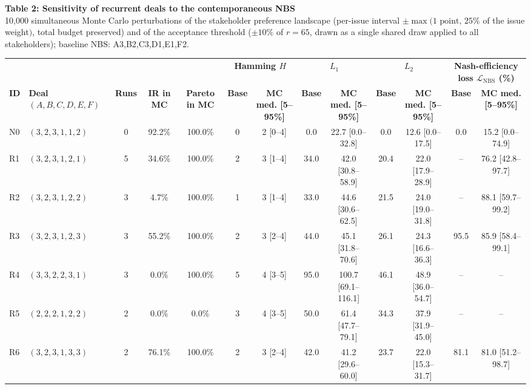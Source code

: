 \documentclass[9pt,a4paper]{article}
\newcommand{\NBS}{\mathrm{NBS}}
\begin{document}
\begin{landscape}\thispagestyle{empty}
{\Large\bfseries Table 2: Sensitivity of recurrent deals to the contemporaneous NBS}\\
{\small 10,000 simultaneous Monte Carlo perturbations of the stakeholder preference landscape (per-issue interval $\pm\max(1\text{ point},\,25\%$ of the issue weight$)$, total budget preserved) and of the acceptance threshold ($\pm10\%$ of $r=65$, drawn as a single shared draw applied to all stakeholders); baseline NBS: A3,B2,C3,D1,E1,F2.}\par\vspace{2mm}
\centering\scriptsize\setlength{\tabcolsep}{2.3pt}\renewcommand{\arraystretch}{1.16}
\begin{tabular}{@{}llccc|cc|cc|cc|cc@{}}
\toprule
&&&&&\multicolumn{2}{c|}{\textbf{Hamming $H$}}&\multicolumn{2}{c|}{\textbf{$L_1$}}&\multicolumn{2}{c|}{\textbf{$L_2$}}&\multicolumn{2}{c}{\textbf{Nash-efficiency loss $\mathcal L_{\NBS}$ (\%)}}\\
\cmidrule(lr){6-7}\cmidrule(lr){8-9}\cmidrule(lr){10-11}\cmidrule(lr){12-13}
\textbf{ID}&\textbf{Deal $(A,B,C,D,E,F)$}&\textbf{Runs}&\textbf{IR in MC}&\textbf{Pareto in MC}&\textbf{Base}&\textbf{MC med. [5--95\%]}&\textbf{Base}&\textbf{MC med. [5--95\%]}&\textbf{Base}&\textbf{MC med. [5--95\%]}&\textbf{Base}&\textbf{MC med. [5--95\%]}\\
\midrule
N0 & $(3,2,3,1,1,2)$ & 0 & 92.2\% & 100.0\% & 0 & 2 [0--4] & 0.0 & 22.7 [0.0--32.8] & 0.0 & 12.6 [0.0--17.5] & 0.0 & 15.2 [0.0--74.9]\\
R1 & $(3,2,3,1,2,1)$ & 5 & 34.6\% & 100.0\% & 2 & 3 [1--4] & 34.0 & 42.0 [30.8--58.9] & 20.4 & 22.0 [17.9--28.9] & -- & 76.2 [42.8--97.7]\\
R2 & $(3,2,3,1,2,2)$ & 3 & 4.7\% & 100.0\% & 1 & 3 [1--4] & 33.0 & 44.6 [30.6--62.5] & 21.5 & 24.0 [19.0--31.8] & -- & 88.1 [59.7--99.2]\\
R3 & $(3,2,3,1,2,3)$ & 3 & 55.2\% & 100.0\% & 2 & 3 [2--4] & 44.0 & 45.1 [31.8--70.6] & 26.1 & 24.3 [16.6--36.3] & 95.5 & 85.9 [58.4--99.1]\\
R4 & $(3,3,2,2,3,1)$ & 3 & 0.0\% & 100.0\% & 5 & 4 [3--5] & 95.0 & 100.7 [69.1--116.1] & 46.1 & 48.9 [36.0--54.7] & -- & --\\
R5 & $(2,2,2,1,2,2)$ & 2 & 0.0\% & 0.0\% & 3 & 4 [3--5] & 50.0 & 61.4 [47.7--79.1] & 34.3 & 37.9 [31.9--45.0] & -- & --\\
R6 & $(3,2,3,1,3,3)$ & 2 & 76.1\% & 100.0\% & 2 & 3 [2--4] & 42.0 & 41.2 [29.6--60.0] & 23.7 & 22.0 [15.3--31.7] & 81.1 & 81.0 [51.2--98.7]\\

\end{tabular}
\end{landscape}
\end{document}
